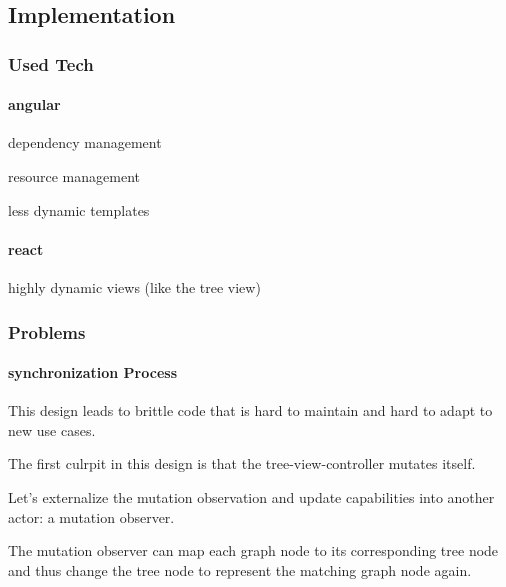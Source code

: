 \subsection{Implementation}\label{implementation}

\subsubsection{Used Tech}\label{used-tech}

\paragraph{angular}\label{angular}

\begin{itemize*}
\item
  dependency management
\item
  resource management
\item
  less dynamic templates
\end{itemize*}

\paragraph{react}\label{react}

\begin{itemize*}
\item
  highly dynamic views (like the tree view)
\end{itemize*}

\subsubsection{Problems}\label{problems}

\paragraph{synchronization Process}\label{synchronization-process}

This design leads to brittle code that is hard to maintain and hard to
adapt to new use cases.

The first culrpit in this design is that the tree-view-controller
mutates itself.

Let's externalize the mutation observation and update capabilities into
another actor: a mutation observer.

The mutation observer can map each graph node to its corresponding tree
node and thus change the tree node to represent the matching graph node
again.

